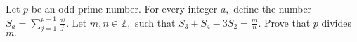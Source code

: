 Let 
$p$
 be an odd prime number. For every integer 
$a,$
 define the number 
$S_a = \sum^{p-1}_{j=1} \frac{a^j}{j}.$
 Let 
$m,n \in \mathbb{Z},$
 such that 
$S_3 + S_4 - 3S_2 = \frac{m}{n}.$
 Prove that 
$p$
 divides 
$m.$
